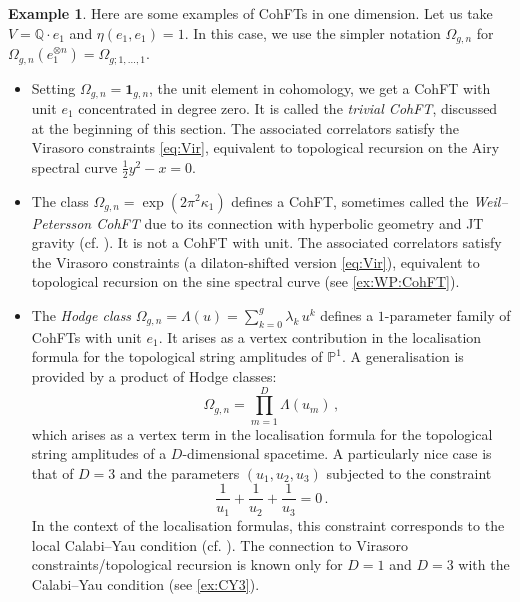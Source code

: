 \documentclass[11pt,reqno]{amsart}
\numberwithin{equation}{section}
\newcommand{\mb}[1]{\mathbb{#1}}
\newcommand{\Q}{\mb{Q}}
\renewcommand{\P}{\mb{P}}
\theoremstyle{plain}
\theoremstyle{definition}
\newtheorem{example}[theorem]{Example}
\begin{document}
\begin{example}\label{expl:CohFTs}
  Here are some examples of CohFTs in one dimension. Let us take $V = \Q \cdot e_1$ and $\eta(e_1,e_1) = 1$. In this case, we use the simpler notation $\Omega_{g,n}$ for $\Omega_{g,n}(e_1^{\otimes n}) = \Omega_{g;1,\ldots,1}$.
  \begin{itemize}
    \item
    Setting $\Omega_{g,n} = \bm{1}_{g,n}$, the unit element in cohomology, we get a CohFT with unit $e_1$ concentrated in degree zero. It is called the \emph{trivial CohFT}, discussed at the beginning of this section. The associated correlators satisfy the Virasoro constraints \eqref{eq:Vir}, equivalent to topological recursion on the Airy spectral curve $\frac{1}{2}y^2 - x = 0$.

    \item
    The class $\Omega_{g,n} = \exp(2\pi^2 \kappa_1)$ defines a CohFT, sometimes called the \emph{Weil--Petersson CohFT} due to its connection with hyperbolic geometry and JT gravity (cf. \cite{Joh,Tur26}). It is not a CohFT with unit. The associated correlators satisfy the Virasoro constraints (a dilaton-shifted version \eqref{eq:Vir}), equivalent to topological recursion on the sine spectral curve (see \cref{ex:WP:CohFT}).

    \item
    The \emph{Hodge class} $\Omega_{g,n} = \Lambda(u) = \sum_{k=0}^{g} \lambda_k \, u^k$ defines a $1$-parameter family of CohFTs with unit $e_1$. It arises as a vertex contribution in the localisation formula for the topological string amplitudes of $\P^1$. A generalisation is provided by a product of Hodge classes:
    \begin{equation}
      \Omega_{g,n}
      =
      \prod_{m=1}^{D} \Lambda(u_m) \,,
    \end{equation}
    which arises as a vertex term in the localisation formula for the topological string amplitudes of a $D$-dimensional spacetime. A particularly nice case is that of $D = 3$ and the parameters $(u_1,u_2,u_3)$ subjected to the constraint
    \begin{equation}
      \frac{1}{u_1} + \frac{1}{u_2} + \frac{1}{u_3} = 0 \,.
    \end{equation}
    In the context of the localisation formulas, this constraint corresponds to the local Calabi--Yau condition \cite{MV02,LLZ03,OP04} (cf. \cite{Liu}). The connection to Virasoro constraints/topological recursion is known only for $D = 1$ and $D = 3$ with the Calabi--Yau condition (see \cref{ex:CY3}).


\end{itemize}
\end{example}
\end{document}
